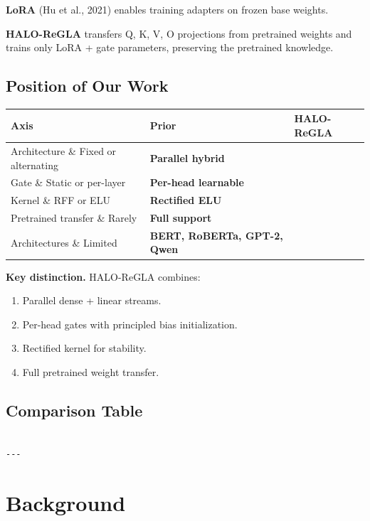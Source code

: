 \textbf{LoRA} (Hu et al., 2021) enables training adapters on frozen base weights.

\textbf{HALO-ReGLA} transfers Q, K, V, O projections from pretrained weights and 
trains only LoRA + gate parameters, preserving the pretrained knowledge.

\subsection{Position of Our Work}

\begin{table}[H]
\centering
\small
\begin{tabular}{lll}
\toprule
\textbf{Axis} & \textbf{Prior} & \textbf{HALO-ReGLA} \\
\midrule
Architecture \& Fixed or alternating & \textbf{Parallel hybrid} \\
Gate \& Static or per-layer & \textbf{Per-head learnable} \\
Kernel \& RFF or ELU & \textbf{Rectified ELU} \\
Pretrained transfer \& Rarely & \textbf{Full support} \\
Architectures \& Limited & \textbf{BERT, RoBERTa, GPT-2, Qwen} \\
\bottomrule
\end{tabular}
\end{table}

\textbf{Key distinction.} HALO-ReGLA combines:
\begin{enumerate}
\item Parallel dense + linear streams.
\item Per-head gates with principled bias initialization.
\item Rectified kernel for stability.
\item Full pretrained weight transfer.

\end{enumerate}
\subsection{Comparison Table}

\begin{lstlisting}

---
\end{lstlisting}


\section{Background}

